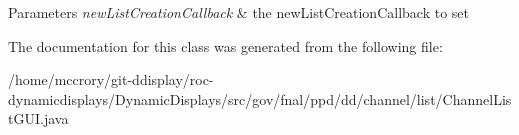 \begin{DoxyParams}{Parameters}
{\em new\-List\-Creation\-Callback} & the new\-List\-Creation\-Callback to set \\
\hline
\end{DoxyParams}


The documentation for this class was generated from the following file\-:\begin{DoxyCompactItemize}
\item 
/home/mccrory/git-\/ddisplay/roc-\/dynamicdisplays/\-Dynamic\-Displays/src/gov/fnal/ppd/dd/channel/list/Channel\-List\-G\-U\-I.\-java\end{DoxyCompactItemize}
